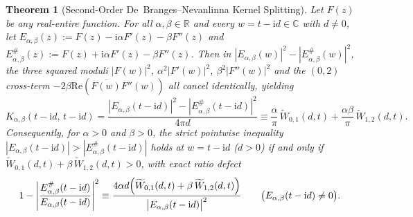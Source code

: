 \documentclass[11pt,reqno]{amsart}
\newtheorem{theorem}{Theorem}[section]
\theoremstyle{definition}
\theoremstyle{remark}
\numberwithin{equation}{section}
\newcommand{\R}{\mathbb{R}}
\newcommand{\C}{\mathbb{C}}
\newcommand{\ii}{\mathrm{i}}
\newcommand{\Rea}{\mathrm{Re}}
\begin{document}
\begin{theorem}[Second-Order De~Branges--Nevanlinna Kernel Splitting]\label{thm:second_order_kernel}
Let $F(z)$ be any real-entire function. For all $\alpha, \beta \in \R$ and every $w = t - \ii d \in \C$ with $d \neq 0$, let $E_{\alpha,\beta}(z) := F(z) - \ii\alpha F'(z) - \beta F''(z)$ and $E_{\alpha,\beta}^\#(z) := F(z) + \ii\alpha F'(z) - \beta F''(z)$. Then in $|E_{\alpha,\beta}(w)|^2 - |E_{\alpha,\beta}^\#(w)|^2$, the three squared moduli $|F(w)|^2$, $\alpha^2|F'(w)|^2$, $\beta^2|F''(w)|^2$ and the $(0,2)$ cross-term $-2\beta\Rea(\overline{F(w)}F''(w))$ all cancel identically, yielding
\begin{equation}\label{eq:boxed_second_order_kernel}
\boxed{K_{\alpha,\beta}(t - \ii d,\, t - \ii d) = \frac{|E_{\alpha,\beta}(t - \ii d)|^2 - |E_{\alpha,\beta}^\#(t - \ii d)|^2}{4\pi d} \equiv \frac{\alpha}{\pi}\,\widetilde{W}_{0,1}(d,t) + \frac{\alpha\beta}{\pi}\,\widetilde{W}_{1,2}(d,t).}
\end{equation}
Consequently, for $\alpha > 0$ and $\beta > 0$, the strict pointwise inequality $|E_{\alpha,\beta}(t-\ii d)| > |E_{\alpha,\beta}^\#(t-\ii d)|$ holds at $w = t - \ii d$ ($d > 0$) if and only if $\widetilde{W}_{0,1}(d,t) + \beta\,\widetilde{W}_{1,2}(d,t) > 0$, with exact ratio defect
\begin{equation}\label{eq:schur_defect_second_order}
1 - \left|\frac{E_{\alpha,\beta}^\#(t - \ii d)}{E_{\alpha,\beta}(t - \ii d)}\right|^2 \equiv \frac{4\alpha d\Bigl(\widetilde{W}_{0,1}(d,t) + \beta\,\widetilde{W}_{1,2}(d,t)\Bigr)}{\bigl|E_{\alpha,\beta}(t - \ii d)\bigr|^2} \qquad \bigl(E_{\alpha,\beta}(t-\ii d) \neq 0\bigr).
\end{equation}
\end{theorem}
\end{document}
